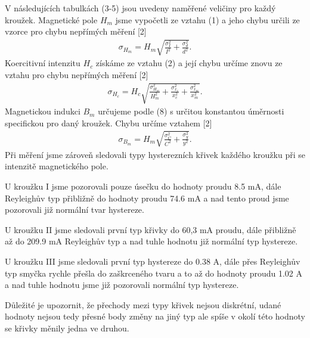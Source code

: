 \documentclass{article}
\begin{document}
\par V následujících tabulkách (3-5) jsou uvedeny naměřené veličiny pro každý kroužek. Magnetické pole $H_m$ jsme vypočetli ze vztahu (1) a jeho chybu určili ze vzorce pro chybu nepřímých měření [2]
\begin{align}
    \sigma_{H_m} = H_m \sqrt{\frac{\sigma^2_I}{I^2} + \frac{\sigma^2_d}{d^2}}.
\end{align}
Koercitivní intenzitu $H_c$ získáme ze vztahu (2) a její chybu určíme znovu ze vztahu pro chybu nepřímých měření [2]
\begin{align}
    \sigma_{H_c} = H_c\sqrt{\frac{\sigma^2_{H_m}}{H^2_m} + \frac{\sigma^2_{x_c}}{x^2_c} + \frac{\sigma^2_{x_m}}{x^2_m}}.
\end{align}
Magnetickou indukci $B_m$ určujeme podle (8) s určitou konstantou úměrnosti specifickou pro daný kroužek. Chybu určíme vztahem [2]
\begin{align}
    \sigma_{B_m} = H_m \sqrt{\frac{\sigma^2_C}{C^2} + \frac{\sigma^2_y}{y^2}}.
\end{align}
Při měření jsme zároveň sledovali typy hysterezních křivek každého kroužku při se intenzitě magnetického pole.
\par U kroužku I jsme pozorovali pouze úsečku do hodnoty proudu 8.5 mA, dále Reyleighův typ přibližně do hodnoty proudu 74.6 mA a nad tento proud jsme pozorovali již normální tvar hystereze.
\par U kroužku II jsme sledovali první typ křivky do 60,3 mA proudu, dále přibližně až do 209.9 mA Reyleighův typ a nad tuhle hodnotu již normální typ hystereze.
\par U kroužku III jsme sledovali první typ hystereze do 0.38 A, dále přes Reyleighův typ smyčka rychle přešla do zaškrceného tvaru a to až do hodnoty proudu 1.02 A a nad tuhle hodnotu jsme již pozorovali normální typ hystereze.
\par Důležité je upozornit, že přechody mezi typy křivek nejsou diskrétní, udané hodnoty nejsou tedy přesné body změny na jiný typ ale spíše v okolí této hodnoty se křivky měnily jedna ve druhou.
\newpage
\end{document}
